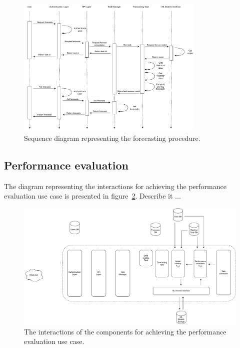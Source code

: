 \begin{figure}[H]
\centering
\includegraphics[width=0.8\textwidth]{images/architecture_forecasting_sequence}
\caption{Sequence diagram representing the forecasting procedure.}
\label{fig:forecastingsequence}
\end{figure}


\vspace{0.1 cm}
\subsection{Performance evaluation}
\label{sec:scheduler}
\vspace{0.1 cm}


The diagram representing the interactions for achieving the performance evaluation use case is presented in figure~\ref{fig:schedulerinteractions}.
Describe it ...

\begin{figure}[H]
\centering
\includegraphics[width=1\textwidth]{images/architecture_scheduler_interactions}
\caption{The interactions of the components for achieving the performance evaluation use case.}
\label{fig:schedulerinteractions}
\end{figure}

